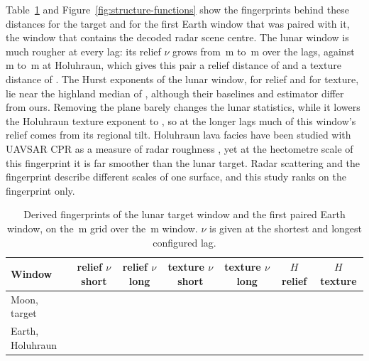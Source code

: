 Table~\ref{tab:first-pair} and Figure~\ref{fig:structure-functions} show the fingerprints behind
these distances for the target and for the first Earth window that was paired with it, the window
that contains the decoded radar scene centre. The lunar window is much rougher at every lag: its
relief $\nu$ grows from \MoonTargetReliefNuShort\,m to \MoonTargetReliefNuLong\,m over the lags,
against \EarthCardReliefNuShort\,m to \EarthCardReliefNuLong\,m at Holuhraun, which gives this pair
a relief distance of \FirstReliefDistance{} and a texture distance of \FirstTextureDistance. The
Hurst exponents of the lunar window, \MoonTargetReliefH{} for relief and \MoonTargetTextureH{} for
texture, lie near the highland median of \citet{rosenburg2011}, although their baselines and
estimator differ from ours. Removing the plane barely changes the lunar statistics, while it
lowers the Holuhraun texture exponent to \EarthCardTextureH, so at the longer lags much of this window's relief comes from its regional tilt. Holuhraun lava facies have been studied with UAVSAR CPR as a measure of radar roughness \citep{tolometti2022holuhraun}, yet at the hectometre scale of this fingerprint it is
far smoother than the lunar target. Radar scattering and the fingerprint describe different scales
of one surface, and this study ranks on the fingerprint only.

\begin{table}[tbp]
\centering
\caption{Derived fingerprints of the lunar target window and the first paired Earth window, on the
\ConfigGridM\,m grid over the \ConfigWindowM\,m window. $\nu$ is given at the shortest and longest
configured lag.}
\label{tab:first-pair}
\footnotesize
\begin{tabular}{@{}lcccccc@{}}
\toprule
Window & relief $\nu$ short & relief $\nu$ long & texture $\nu$ short & texture $\nu$ long & $H$ relief & $H$ texture \\
\midrule
Moon, target & \MoonTargetReliefNuShort{} & \MoonTargetReliefNuLong{} & \MoonTargetTextureNuShort{} & \MoonTargetTextureNuLong{} & \MoonTargetReliefH{} & \MoonTargetTextureH{} \\
Earth, Holuhraun & \EarthCardReliefNuShort{} & \EarthCardReliefNuLong{} & \EarthCardTextureNuShort{} & \EarthCardTextureNuLong{} & \EarthCardReliefH{} & \EarthCardTextureH{} \\
\bottomrule
\end{tabular}
\end{table}



